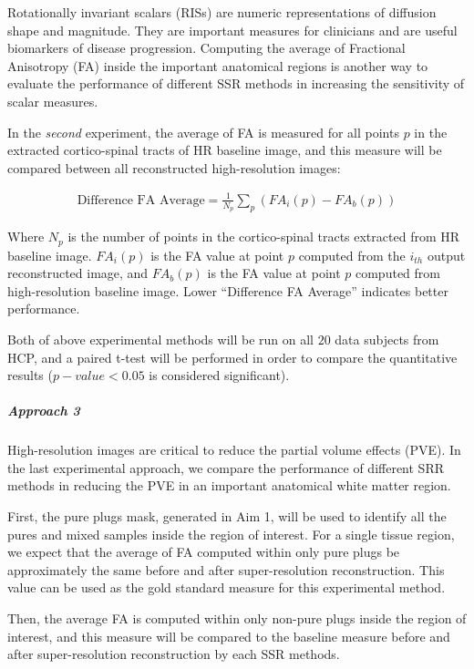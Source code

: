 Rotationally invariant scalars (RISs) are numeric representations
of diffusion shape and magnitude. They are important measures for clinicians and are useful biomarkers of disease progression.
Computing the average of Fractional Anisotropy (FA) inside the important anatomical regions is another way to evaluate the performance of different SSR methods in increasing the sensitivity of scalar measures.

In the \textit{second} experiment, the average of FA is measured for all points $p$ in the extracted cortico-spinal tracts of HR baseline image, and this measure will be compared between all reconstructed high-resolution images:

\begin{equation}
\label{eq:avgFA}
\begin{gathered}
\text{Difference FA Average} = \frac{1}{N_p}\sum_{p} (FA_i(p) - FA_b(p))
\end{gathered}
\end{equation}

Where $N_p$ is the number of points in the cortico-spinal tracts extracted from HR baseline image.
$FA_i(p)$ is the FA value at point $p$ computed from the $i_{th}$ output reconstructed image, and $FA_b(p)$ is the FA value at point $p$ computed from high-resolution baseline image.
Lower ``Difference FA Average'' indicates better performance.

Both of above experimental methods will be run on all $20$ data subjects from HCP, and a paired t-test will be performed in order to compare the quantitative results ($p-value < 0.05$ is considered significant).

\subparagraph*{Approach 3}

High-resolution images are critical to reduce the partial volume effects (PVE). In the last experimental approach, we compare the performance of different SRR methods in reducing the PVE in an important anatomical white matter region.

First, the pure plugs mask, generated in Aim 1, will be used to identify all the pures and mixed samples inside the region of interest.
For a single tissue region, we expect that the average of FA computed within only pure plugs be approximately the same before and after super-resolution reconstruction. This value can be used as the gold standard measure for this experimental method.

Then, the average FA is computed within only non-pure plugs inside the region of interest, and this measure will be compared to the baseline measure before and after super-resolution reconstruction by each SSR methods.

